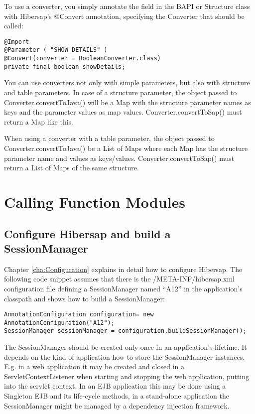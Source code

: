 To use a converter, you simply annotate the field in the BAPI or Structure class with Hibersap's @Convert annotation, specifying the Converter that should be called:
\\
\begin{lstlisting}[caption=Using a converter]
@Import
@Parameter ( "SHOW_DETAILS" )
@Convert(converter = BooleanConverter.class)
private	final boolean showDetails;
\end{lstlisting}

You can use converters not only with simple parameters, but also with structure and table parameters. In case of a structure parameter, the object passed to Converter.convertToJava() will be a Map with the structure parameter names as keys and the parameter values as map values. Converter.convertToSap() must return a Map like this.

When using a converter with a table parameter, the object passed to Converter.convertToJava() be a List of Maps where each Map has the structure parameter name and values as keys/values. Converter.convertToSap() must return a List of Maps of the same structure.

\section{Calling Function Modules}

\subsection{Configure Hibersap and build a SessionManager}
Chapter \ref{cha:Configuration} explains in detail how to configure Hibersap. The following code snippet assumes that there is the /META-INF/hibersap.xml configuration file defining a SessionManager named ``A12'' in the application's classpath and shows how to build a SessionManager:


\begin{lstlisting}[caption=Building the SessionManager]
AnnotationConfiguration configuration= new AnnotationConfiguration("A12"); 
SessionManager sessionManager = configuration.buildSessionManager();
\end{lstlisting}
    
The SessionManager should be created only once in an application's lifetime. It depends on the kind of application how to store the SessionManager instances. E.g. in a web application it may be created and closed in a ServletContextListener when starting and stopping the web application, putting into the servlet context. In an EJB application this may be done using a Singleton EJB and its life-cycle methods, in a stand-alone application the SessionManager might be managed by a dependency injection framework.


